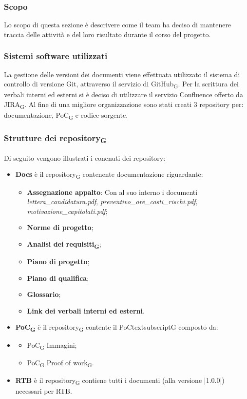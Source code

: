 \subsubsection{Scopo}
Lo scopo di questa sezione è descrivere come il team ha deciso di mantenere traccia delle attività e del loro risultato durante il corso del progetto. 

\subsubsection{Sistemi software utilizzati}
La gestione delle versioni dei documenti viene effettuata utilizzato il sistema di controllo di versione Git, attraverso il servizio di GitHub\textsubscript{G}. Per la scrittura dei verbali interni ed esterni si è deciso di utilizzare il servizio Confluence offerto da JIRA\textsubscript{G}.
Al fine di una migliore organizzazione sono stati creati 3 repository per: documentazione, PoC\textsubscript{G} e codice sorgente.
\subsubsection{Strutture dei repository\textsubscript{G}}
Di seguito vengono illustrati i conenuti dei repository:
\begin{itemize}
\item \textbf{Docs} è il repository\textsubscript{G} contenente documentazione riguardante:
\begin{itemize}
    \item \textbf{Assegnazione appalto}: Con al suo interno i documenti \textit{lettera_candidatura.pdf}, \textit{preventivo\_ore\_costi\_rischi.pdf}, \textit{motivazione\_capitolati.pdf};
    \item \textbf{Norme di progetto};
    \item \textbf{Analisi dei requisiti\textsubscript{G}};
    \item \textbf{Piano di progetto};
    \item \textbf{Piano di qualifica};
    \item \textbf{Glossario};
    \item \textbf{Link dei verbali interni ed esterni}.
\end{itemize}
\item \textbf{PoC\textsubscript{G}} è il repository\textsubscript{G} contente il PoCtextsubscript{G} composto da:
\item \begin{itemize}
	\item PoC\textsubscript{G} Immagini;
	\item PoC\textsubscript{G} Proof of work\textsubscript{G}.
\end{itemize}
\item \textbf{RTB} è il repository\textsubscript{G} contiene tutti i documenti (alla versione |1.0.0|) necessari per RTB.
\end{itemize}
